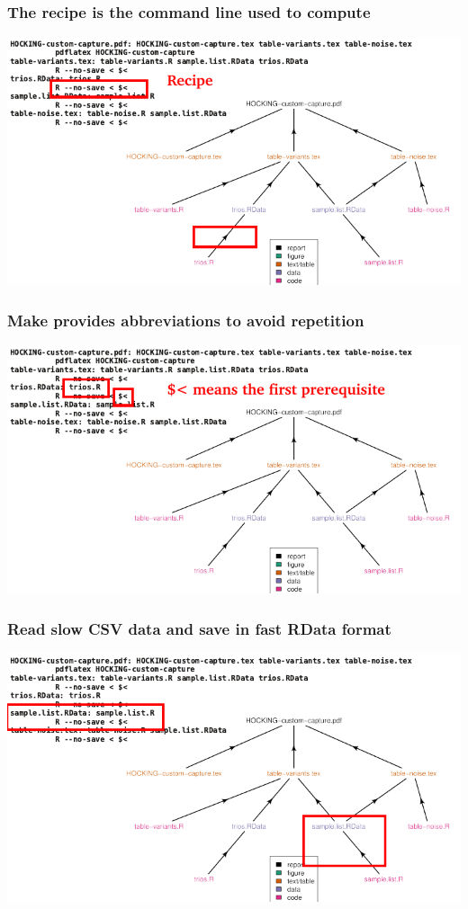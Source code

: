 \documentclass{beamer}
\begin{document}
\begin{frame}
  \frametitle{The recipe is the command line used to compute}
  \includegraphics[width=\textwidth]{figure-code-dag-line3-recipe}
\end{frame}

\begin{frame}
  \frametitle{Make provides abbreviations to avoid repetition}
  \includegraphics[width=\textwidth]{figure-code-dag-line3-abbrev}
\end{frame}

\begin{frame}
  \frametitle{Read slow CSV data and save in fast RData format}
  \includegraphics[width=\textwidth]{figure-code-dag-line4}
\end{frame}
\end{document}
